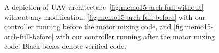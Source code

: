 \begin{figure}[t]
\begin{subfigure}[t]{.3\linewidth}
\begin{tikzpicture}
  \end{tikzpicture}
  \caption{}
  \label{fig:memo15-arch-full-after}
\end{subfigure}

\caption{A depiction of UAV architecture~\ref{fig:memo15-arch-full-without}
  without any modification, \ref{fig:memo15-arch-full-before} with our
  controller running before the motor mixing code, and
  \ref{fig:memo15-arch-full-before} with our controller running after the
  motor mixing code. Black boxes denote verified code.}
\label{fig:arch}
\end{figure}
